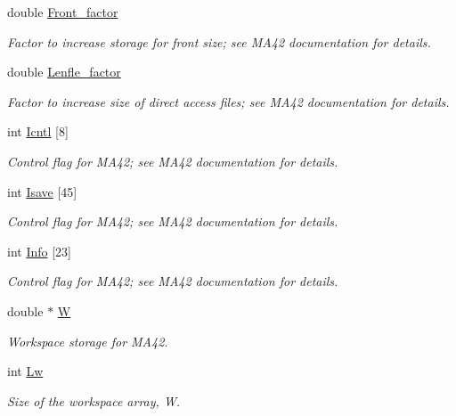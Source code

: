 \begin{DoxyCompactItemize}
double \hyperlink{classoomph_1_1HSL__MA42_aa685586e76b9e65184c4a2fd1866b1bb}{Front\+\_\+factor}
\begin{DoxyCompactList}\small\item\em Factor to increase storage for front size; see M\+A42 documentation for details. \end{DoxyCompactList}\item 
double \hyperlink{classoomph_1_1HSL__MA42_a2aace9e5575adf75ccef54b744831585}{Lenfle\+\_\+factor}
\begin{DoxyCompactList}\small\item\em Factor to increase size of direct access files; see M\+A42 documentation for details. \end{DoxyCompactList}\item 
int \hyperlink{classoomph_1_1HSL__MA42_a607d4df18fa90208a18fbd7073412b53}{Icntl} \mbox{[}8\mbox{]}
\begin{DoxyCompactList}\small\item\em Control flag for M\+A42; see M\+A42 documentation for details. \end{DoxyCompactList}\item 
int \hyperlink{classoomph_1_1HSL__MA42_a60b94dff66e7add9183e9c6e86786cfc}{Isave} \mbox{[}45\mbox{]}
\begin{DoxyCompactList}\small\item\em Control flag for M\+A42; see M\+A42 documentation for details. \end{DoxyCompactList}\item 
int \hyperlink{classoomph_1_1HSL__MA42_abc3b3ea69eb833ee2c5d81509f26a6fe}{Info} \mbox{[}23\mbox{]}
\begin{DoxyCompactList}\small\item\em Control flag for M\+A42; see M\+A42 documentation for details. \end{DoxyCompactList}\item 
double $\ast$ \hyperlink{classoomph_1_1HSL__MA42_ad12e72f377a117d7a106af587bcf4cac}{W}
\begin{DoxyCompactList}\small\item\em Workspace storage for M\+A42. \end{DoxyCompactList}\item 
int \hyperlink{classoomph_1_1HSL__MA42_a0248d831f42eaf222c4283d17bdc2f5e}{Lw}
\begin{DoxyCompactList}\small\item\em Size of the workspace array, W. \end{DoxyCompactList}\item 

\end{DoxyCompactItemize}
